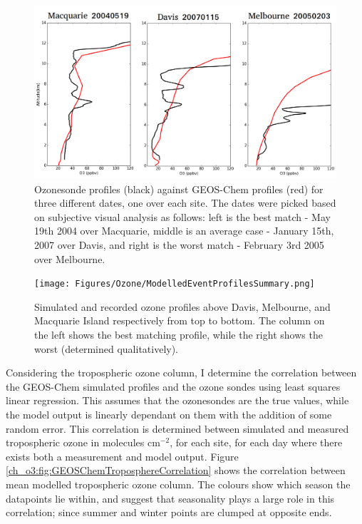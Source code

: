     \begin{figure}[!htbp]
      \includegraphics[width=\textwidth]{Figures/Ozone/event_profile_comparison.png}
      \caption{Ozonesonde profiles (black) against GEOS-Chem profiles (red) for three different dates, one over each site.
      The dates were picked based on subjective visual analysis as follows: left is the best match - May 19th 2004 over Macquarie, middle is an average case - January 15th, 2007 over Davis, and right is the worst match - February 3rd 2005 over Melbourne.}
      \label{ch_o3:fig:event_profile_comparison}
    \end{figure}
    
    \begin{figure}[!htbp]
      \texttt{[image: Figures/Ozone/ModelledEventProfilesSummary.png]}
      \caption{Simulated and recorded ozone profiles above Davis, Melbourne, and Macquarie Island respectively from top to bottom.
      The column on the left shows the best matching profile, while the right shows the worst (determined qualitatively).}
      \label{ch_o3:fig:GEOSChemEventProfilesSummary}
    \end{figure}
    
    Considering the tropospheric ozone column, I determine the correlation between the GEOS-Chem simulated profiles and the ozone sondes using least squares linear regression.
    This assumes that the ozonesondes are the true values, while the model output is linearly dependant on them with the addition of some random error.
    This correlation is determined between simulated and measured tropospheric ozone in molecules cm$^{-2}$, for each site, for each day where there exists both a measurement and model output.
    Figure \ref{ch_o3:fig:GEOSChemTroposphereCorrelation} shows the correlation between mean modelled tropospheric ozone column.
    The colours show which season the datapoints lie within, and suggest that seasonality plays a large role in this correlation; since summer and winter points are clumped at opposite ends.
    
